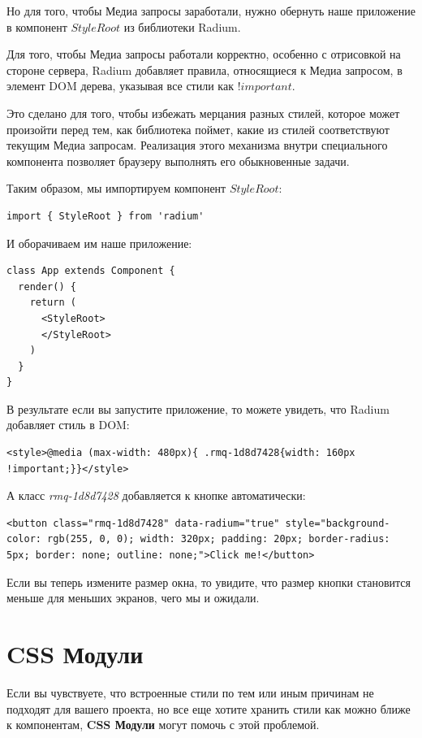 Но для того, чтобы Медиа запросы заработали, нужно обернуть наше приложение в компонент $StyleRoot$ из библиотеки Radium.

Для того, чтобы Медиа запросы работали корректно, особенно с отрисовкой на стороне сервера, Radium добавляет правила, относящиеся к Медиа запросом, в элемент DOM дерева, указывая все стили как $!important$.

Это сделано для того, чтобы избежать мерцания разных стилей, которое может произойти перед тем, как библиотека поймет, какие из стилей соответствуют текущим Медиа запросам. Реализация этого механизма внутри специального компонента позволяет браузеру выполнять его обыкновенные задачи.

Таким образом, мы импортируем компонент $StyleRoot$:

\begin{lstlisting}
import { StyleRoot } from 'radium'
\end{lstlisting}

И оборачиваем им наше приложение:

\begin{lstlisting}
class App extends Component {
  render() {
    return (
      <StyleRoot>
      </StyleRoot>
    )
  }
}
\end{lstlisting}

В результате если вы запустите приложение, то можете увидеть, что Radium добавляет стиль в DOM:

\begin{lstlisting}
<style>@media (max-width: 480px){ .rmq-1d8d7428{width: 160px !important;}}</style>
\end{lstlisting}

А класс \textit{rmq-1d8d7428} добавляется к кнопке автоматически:

\begin{lstlisting}
<button class="rmq-1d8d7428" data-radium="true" style="background-color: rgb(255, 0, 0); width: 320px; padding: 20px; border-radius: 5px; border: none; outline: none;">Click me!</button>	
\end{lstlisting}

Если вы теперь измените размер окна, то увидите, что размер кнопки становится меньше для меньших экранов, чего мы и ожидали.

\section{CSS Модули}

Если вы чувствуете, что встроенные стили по тем или иным причинам не подходят для вашего проекта, но все еще хотите хранить стили как можно ближе к компонентам, \textbf{CSS Модули} могут помочь с этой проблемой.

